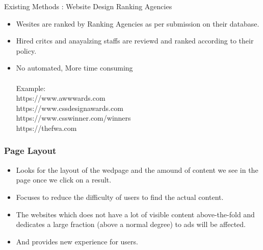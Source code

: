 \documentclass[11pt]{beamer}
\begin{document}
	\begin{frame}{Existing Methods : Website Design Ranking Agencies }
		\begin{itemize}
			\item Wesites are ranked by Ranking Agencies as per submission on their database.
			\item Hired critcs and anayalzing staffs are reviewd and ranked according to their policy.
			\item No automated, More time consuming\\\
			\\Example:\\
			https://www.awwwards.com\\

			https://www.cssdesignawards.com\\

			https://www.csswinner.com/winners\\

			https://thefwa.com\\
		\end{itemize}
	\end{frame}
	\begin{frame}
\frametitle{\textbf{Page Layout}}
\begin{itemize}
	\item Looks for the layout of the wedpage and the amound of content we see in the page once we click on a result.
	
	\item Focuses to reduce the difficulty of users to find the actual content.
	
	\item  The websites which does not have a lot of visible content above-the-fold and dedicates a large fraction (above a normal degree) to ads will be affected.
	
	\item And provides new experience for users.
\end{itemize}

\end{frame}
\end{document}
